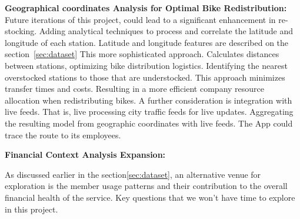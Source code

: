 \documentclass[12pt, a4paper]{article}
\begin{document}
        \textbf{Geographical coordinates Analysis for Optimal Bike Redistribution:} \newline
            Future iterations of this project, could lead to a significant enhancement in re-stocking.\newline
            Adding analytical techniques to process and correlate the latitude and longitude of each station.
            Latitude and longitude features are described on the section~\ref{sec:dataset}\newline
            This more sophisticated approach. Calculates distances between stations, optimizing bike distribution logistics.\newline
            Identifying the nearest overstocked stations to those that are understocked.
            This approach minimizes transfer times and costs.
            Resulting in a more efficient company resource allocation when redistributing bikes.\newline
            A further consideration is integration with live feeds.
            That is, live processing city traffic feeds for live updates.
            Aggregating the resulting model from geographic coordinates with live feeds.
            The App could trace the route to its employees.

        \textbf{Financial Context Analysis Expansion:}

        As discussed earlier in the section\ref{sec:dataset}, an alternative venue for exploration is the member usage patterns and their contribution to the overall financial health of the service.\newline
        \newline Key questions that we won't have time to explore in this project.
\end{document}
